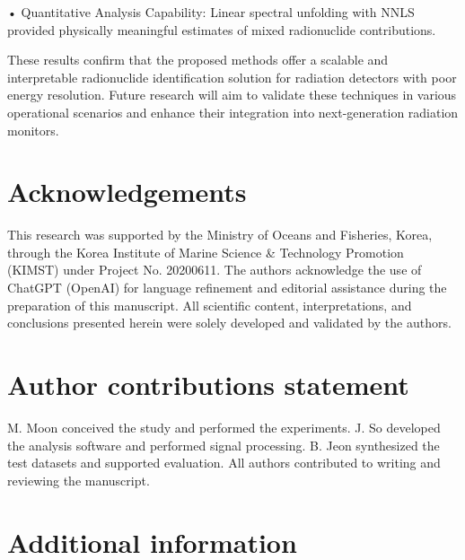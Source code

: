 \documentclass[10pt]{wlscirep}
\begin{document}
• Quantitative Analysis Capability: Linear spectral unfolding with NNLS provided physically meaningful estimates of mixed radionuclide contributions.


These results confirm that the proposed methods offer a scalable and interpretable radionuclide identification solution for radiation detectors with poor energy resolution. Future research will aim to validate these techniques in various operational scenarios and enhance their integration into next-generation radiation monitors.




\section*{Acknowledgements}

This research was supported by the Ministry of Oceans and Fisheries, Korea, through the Korea Institute of Marine Science \& Technology Promotion (KIMST) under Project No. 20200611. The authors acknowledge the use of ChatGPT (OpenAI) for language refinement and editorial assistance during the preparation of this manuscript. All scientific content, interpretations, and conclusions presented herein were solely developed and validated by the authors.

\section*{Author contributions statement}
M. Moon conceived the study and performed the experiments. J. So developed the analysis software and performed signal processing. B. Jeon synthesized the test datasets and supported evaluation. All authors contributed to writing and reviewing the manuscript.



\section*{Additional information}
\end{document}
